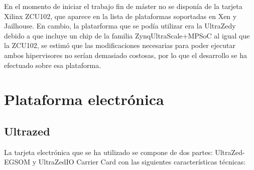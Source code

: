 En el momento de iniciar el trabajo fin de máster no se disponía de la tarjeta Xilinx ZCU102, que aparece en la lista de plataformas soportadas en Xen y Jailhouse. En cambio, la platarforma que se podía utilizar era la UltraZed\texttrademark y debido a que incluye un chip de la familia Zynq\textregistered UltraScale+\texttrademark MPSoC al igual que la ZCU102, se estimó que las modificaciones necesarias para poder ejecutar ambos hipervisores no serían demasiado costosas, por lo que el desarrollo se ha efectuado sobre esa plataforma.

\section{Plataforma electrónica}
\subsection{Ultrazed\texttrademark}
La tarjeta electrónica que se ha utilizado se compone de dos partes: UltraZed-EG\texttrademark SOM y UltraZed\texttrademark IO Carrier Card con las siguientes características técnicas:
